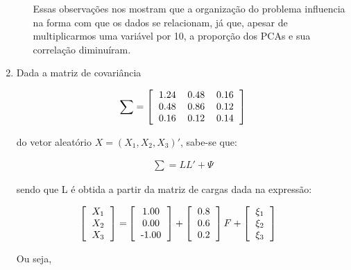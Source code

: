 \documentclass[11pt,a4paper]{book}
\begin{document}
\begin{enumerate}
\begin{enumerate}[label=\alph*)]
				Essas observações nos mostram que a organização do problema influencia na forma com que os dados se relacionam, já que, apesar de multiplicarmos uma variável por 10, a proporção dos PCAs e sua correlação diminuíram.
			\end{enumerate}
			
			\item
			
			Dada a matriz de covariância
			
			\begin{eqnarray*}
				\sum=\left[
				\begin{tabular}{c c c }
				1.24 & 0.48 & 0.16\\
				0.48 & 0.86 & 0.12\\
				0.16 & 0.12 & 0.14
				\end{tabular}
				\right]
			\end{eqnarray*}
			
			do vetor aleatório $X=(X_1,X_2,X_3)'$, sabe-se que:
			
			\begin{eqnarray*}
				\sum = LL' + \Psi
			\end{eqnarray*}
			
			sendo que L é obtida a partir da matriz de cargas dada na expressão:
			
			\begin{eqnarray*}
				\left[
				\begin{tabular}{c}
				$X_1$\\
				$X_2$\\
				$X_3$
				\end{tabular}
				\right]=&\left[
				\begin{tabular}{c}
				1.00\\
				0.00\\
				-1.00
				\end{tabular}
				\right]+\left[
				\begin{tabular}{c}
				0.8\\
				0.6\\
				0.2
				\end{tabular}
				\right]F+\left[
				\begin{tabular}{c}
				$\xi_1$\\
				$\xi_2$\\
				$\xi_3$
				\end{tabular}
				\right]
			\end{eqnarray*}
			
			Ou seja,
			

\end{enumerate}
\end{document}
